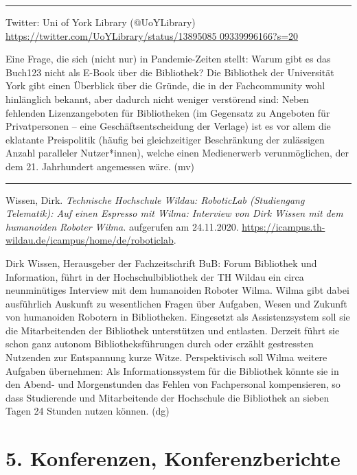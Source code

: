\documentclass[a4paper,
fontsize=11pt,
oneside,
numbers=noperiodatend,
parskip=half-,
bibliography=totoc,
final
]{scrartcl}
\begin{document}
\begin{center}\rule{0.5\linewidth}{0.5pt}\end{center}

Twitter: Uni of York Library (@UoYLibrary)
\href{https://twitter.com/UoYLibrary/status/1389508509339996166?s=20}{https://twitter.com/UoYLibrary/status/13895085 09339996166?s=20}

Eine Frage, die sich (nicht nur) in Pandemie-Zeiten stellt: Warum gibt
es das Buch123 nicht als E-Book über die Bibliothek? Die Bibliothek der
Universität York gibt einen Überblick über die Gründe, die in der
Fachcommunity wohl hinlänglich bekannt, aber dadurch nicht weniger
verstörend sind: Neben fehlenden Lizenzangeboten für Bibliotheken (im
Gegensatz zu Angeboten für Privatpersonen -- eine Geschäftsentscheidung
der Verlage) ist es vor allem die eklatante Preispolitik (häufig bei
gleichzeitiger Beschränkung der zulässigen Anzahl paralleler
Nutzer*innen), welche einen Medienerwerb verunmöglichen, der dem 21.
Jahrhundert angemessen wäre. (mv)

\begin{center}\rule{0.5\linewidth}{0.5pt}\end{center}

Wissen, Dirk. \emph{Technische Hochschule Wildau: RoboticLab
(Studiengang Telematik): Auf einen Espresso mit Wilma: Interview von
Dirk Wissen mit dem humanoiden Roboter Wilma.} aufgerufen am 24.11.2020.
\url{https://icampus.th-wildau.de/icampus/home/de/roboticlab}.

Dirk Wissen, Herausgeber der Fachzeitschrift BuB: Forum Bibliothek und
Information, führt in der Hochschulbibliothek der TH Wildau ein circa
neunminütiges Interview mit dem humanoiden Roboter Wilma. Wilma gibt
dabei ausführlich Auskunft zu wesentlichen Fragen über Aufgaben, Wesen
und Zukunft von humanoiden Robotern in Bibliotheken. Eingesetzt als
Assistenzsystem soll sie die Mitarbeitenden der Bibliothek unterstützen
und entlasten. Derzeit führt sie schon ganz autonom Bibliotheksführungen
durch oder erzählt gestressten Nutzenden zur Entspannung kurze Witze.
Perspektivisch soll Wilma weitere Aufgaben übernehmen: Als
Informationssystem für die Bibliothek könnte sie in den Abend- und
Morgenstunden das Fehlen von Fachpersonal kompensieren, so dass
Studierende und Mitarbeitende der Hochschule die Bibliothek an sieben
Tagen 24 Stunden nutzen können. (dg)

\hypertarget{konferenzen-konferenzberichte}{%
\section{5. Konferenzen,
Konferenzberichte}\label{konferenzen-konferenzberichte}}
\end{document}
